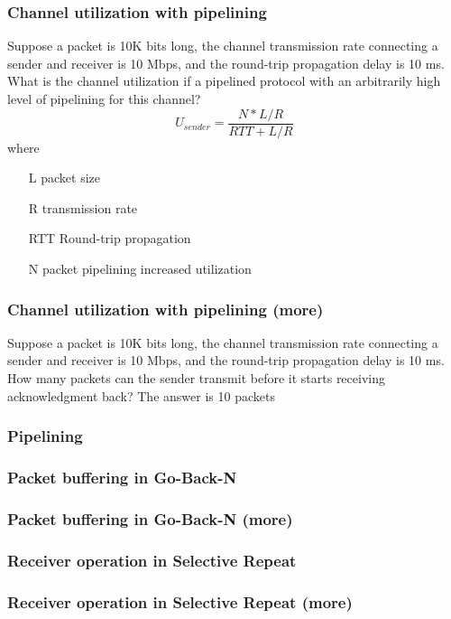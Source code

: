     \newpage
    \subsubsection*{Channel utilization with pipelining}
    \noindent Suppose a packet is 10K bits long, the channel transmission rate connecting a sender and receiver is
    10 Mbps, and the round-trip propagation delay is 10 ms. What is the channel utilization if a pipelined protocol
    with an arbitrarily high level of pipelining for this channel?
    \[U_{sender}=\frac{N*L/R}{RTT+L/R}\]
    where
    \begin{itemize}
        \item[L] packet size 
        \item[R] transmission rate
        \item[RTT]  Round-trip propagation
        \item[N] packet pipelining increased utilization 
    \end{itemize}

    \subsubsection*{Channel utilization with pipelining (more)}
    \noindent Suppose a packet is 10K bits long, the channel transmission rate connecting a sender and receiver is
    10 Mbps, and the round-trip propagation delay is 10 ms. How many packets can the sender transmit before it starts
    receiving acknowledgment back?
    The answer is 10 packets

    \subsubsection*{Pipelining}
    \subsubsection*{Packet buffering in Go-Back-N}
    \subsubsection*{Packet buffering in Go-Back-N (more)}
    \subsubsection*{Receiver operation in Selective Repeat}
    \subsubsection*{Receiver operation in Selective Repeat (more)}


